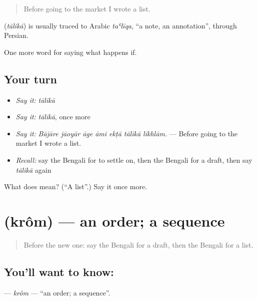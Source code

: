 \begin{quote}
Before going to the market I wrote a list.
\end{quote}

\begin{cousinweb}
\textbf{} (\emph{tālikā}) is usually traced to Arabic \emph{taʿlīqa}, \textquotedblleft{}a note, an annotation\textquotedblright{}, through Persian.
\end{cousinweb}

\begin{grammarlens}[title={What you've built}]
One more word for saying what happens if.
\end{grammarlens}

\subsection*{Your turn}
\begin{itemize}
\raggedright
  \item \emph{Say it:} \emph{tālikā}
  \item \emph{Say it:} \emph{tālikā}, once more
  \item \emph{Say it:} \emph{Bājāre jāoyār āge āmi ekṭā tālikā likhlām.} — Before going to the market I wrote a list.
  \item \emph{Recall:} say the Bengali for to settle on, then the Bengali for a draft, then say \emph{tālikā} again
\end{itemize}

\begin{tcolorbox}[breakable,colback=teal!4,colframe=teal!35!black,title={Before you move on}]
What does  mean? (\textquotedblleft{}A list\textquotedblright{}.) Say it once more.
\end{tcolorbox}
\section[\texorpdfstring{\bn{ক্রম} (krôm)}{ক্রম (krôm)}]{ (krôm) — an order; a sequence}

\label{lesson:BN-C531-krom}



\begin{quote}
Before the new one: say the Bengali for a draft, then the Bengali for a list.
\end{quote}

\subsection*{You'll want to know: }
\textbf{} — \emph{krôm} — \textquotedblleft{}an order; a sequence\textquotedblright{}.

